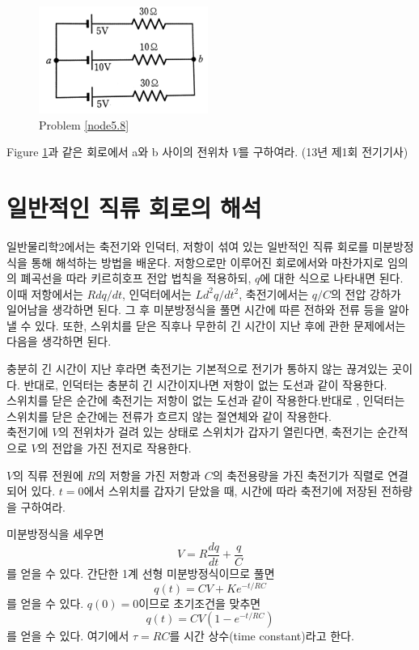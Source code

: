 \begin{problem}\label{node5.8}
\begin{figure}[h]
\centering\includegraphics[scale=1.0]{Pictures/node5.8.png}
\caption{Problem \ref{node5.8}}
\label{fig:node5.8}
\end{figure}
Figure \ref{fig:node5.8}과 같은 회로에서 a와 b 사이의 전위차 $V$를 구하여라. (13년 제1회 전기기사)
\end{problem}

\section{일반적인 직류 회로의 해석}
일반물리학2에서는 축전기와 인덕터, 저항이 섞여 있는 일반적인 직류 회로를 미분방정식을 통해 해석하는 방법을 배운다. 저항으로만 이루어진 회로에서와 마찬가지로 임의의 폐곡선을 따라 키르히호프 전압 법칙을 적용하되, $q$에 대한 식으로 나타내면 된다. 이때 저항에서는 $Rdq/dt$, 인덕터에서는 $Ld^2 q/dt^2$, 축전기에서는 $q/C$의 전압 강하가 일어남을 생각하면 된다. 그 후 미분방정식을 풀면 시간에 따른 전하와 전류 등을 알아낼 수 있다.
또한, 스위치를 닫은 직후나 무한히 긴 시간이 지난 후에 관한 문제에서는 다음을 생각하면 된다.
\begin{remark}
충분히 긴 시간이 지난 후라면 축전기는 기본적으로 전기가 통하지 않는 끊겨있는 곳이다. 반대로, 인덕터는 충분히 긴 시간이지나면 저항이 없는 도선과 같이 작용한다.\\
스위치를 닫은 순간에 축전기는 저항이 없는 도선과 같이 작용한다.반대로 , 인덕터는 스위치를 닫은 순간에는 전류가 흐르지 않는 절연체와 같이 작용한다.\\
축전기에 $V$의 전위차가 걸려 있는 상태로 스위치가 갑자기 열린다면, 축전기는 순간적으로 $V$의 전압을 가진 전지로 작용한다.
\end{remark}
\begin{example}[RC 회로]
$V$의 직류 전원에 $R$의 저항을 가진 저항과 $C$의 축전용량을 가진 축전기가 직렬로 연결되어 있다. $t=0$에서 스위치를 갑자기 닫았을 때, 시간에 따라 축전기에 저장된 전하량을 구하여라.
\end{example}
미분방정식을 세우면
\begin{equation}
V=R\frac{dq}{dt}+\frac{q}{C}
\end{equation}
를 얻을 수 있다. 간단한 1계 선형 미분방정식이므로 풀면 
\begin{equation}
q(t) = CV +Ke^{-t/RC}
\end{equation}
를 얻을 수 있다. $q(0)=0$이므로 초기조건을 맞추면
\begin{equation}
q(t)=CV(1-e^{-t/RC})
\end{equation}
를 얻을 수 있다. 여기에서 $\tau=RC$를 시간 상수(time constant)라고 한다.


